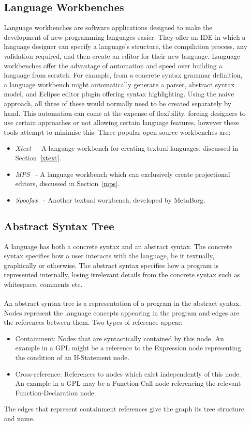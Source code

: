 \documentclass{article}
\begin{document}
\subsection{Language Workbenches}
Language workbenches are software applications designed to make the development of new programming languages easier. They offer an IDE in which a language designer can specify a language's structure, the compilation process, any validation required, and then create an editor for their new language. Language workbenches offer the advantage of automation and speed over building a language from scratch. For example, from a concrete syntax grammar definition, a language workbench might automatically generate a parser, abstract syntax model, and Eclipse editor plugin offering syntax highlighting. Using the naive approach, all three of these would normally need to be created separately by hand. This automation can come at the expense of flexibility, forcing designers to use certain approaches or not allowing certain language features, however these tools attempt to minimise this. Three popular open-source workbenches are:
\begin{itemize}
\item \emph{Xtext}~\cite{xtext} - A language workbench for creating textual languages, discussed in Section~\ref{xtext}.
\item \emph{MPS}~\cite{mps} - A language workbench which can exclusively create projectional editors, discussed in Section~\ref{mps}.
\item \emph{Spoofax}~\cite{spoofax} - Another textual workbench, developed by MetaBorg. 
\end{itemize}
%
\subsection{Abstract Syntax Tree}
A language has both a concrete syntax and an abstract syntax. The concrete syntax specifies how a user interacts with the language, be it textually, graphically or otherwise. The abstract syntax specifies how a program is represented internally, losing irrelevant details from the concrete syntax such as whitespace, comments etc.
\\
\\
An abstract syntax tree is a representation of a program in the abstract syntax. Nodes represent the language concepts appearing in the program and edges are the references between them. Two types of reference appear:
\begin{itemize}
\item Containment: Nodes that are syntactically contained by this node. An example in a GPL might be a reference to the Expression node representing the condition of an If-Statement node.
\item Cross-reference: References to nodes which exist independently of this node. An example in a GPL may be a Function-Call node referencing the relevant Function-Declaration node. 
\end{itemize}
The edges that represent containment references give the graph its tree structure and name.
\end{document}
